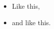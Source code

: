\documentclass[a4paper]{article}
\begin{document}
\begin{itemize}
\item Like this,
\item and like this.
\end{itemize}






%
%
\end{document}
